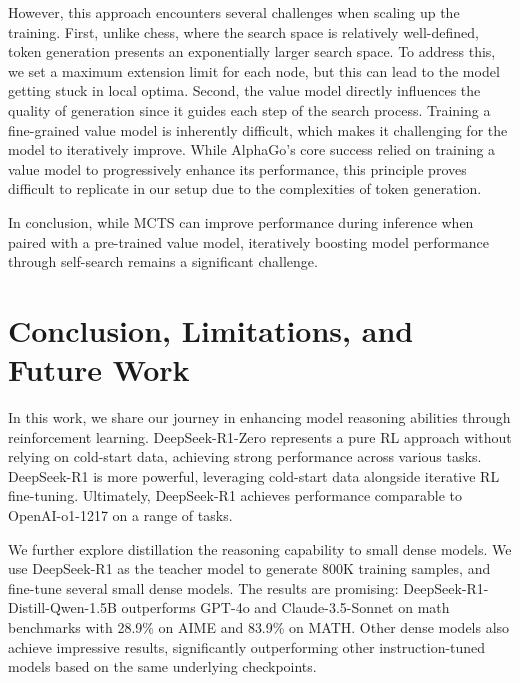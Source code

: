 \documentclass[11pt, a4paper, logo, copyright, nonumbering]{deepseek}
\newcommand{\dsri}{DeepSeek-R1}
\newcommand{\dsro}{DeepSeek-R1-Zero}
\begin{document}
{However, this approach encounters several challenges when scaling up the training. First, unlike chess, where the search space is relatively well-defined, token generation presents an exponentially larger search space. To address this, we set a maximum extension limit for each node, but this can lead to the model getting stuck in local optima. Second, the value model directly influences the quality of generation since it guides each step of the search process. Training a fine-grained value model is inherently difficult, which makes it challenging for the model to iteratively improve. While AlphaGo's core success relied on training a value model to progressively enhance its performance, this principle proves difficult to replicate in our setup due to the complexities of token generation.

In conclusion, while MCTS can improve performance during inference when paired with a pre-trained value model, iteratively boosting model performance through self-search remains a significant challenge.




\section{Conclusion, Limitations, and Future Work}

In this work, we share our journey in enhancing model reasoning abilities through reinforcement learning. \dsro{} represents a pure RL approach without relying on cold-start data, achieving strong performance across various tasks. \dsri{} is more powerful, leveraging cold-start data alongside iterative RL fine-tuning. Ultimately, \dsri{} achieves performance comparable to OpenAI-o1-1217 on a range of tasks.

We further explore distillation the reasoning capability to small dense models. We use \dsri{} as the teacher model to generate 800K training samples, and fine-tune several small dense models. The results are promising: DeepSeek-R1-Distill-Qwen-1.5B outperforms GPT-4o and Claude-3.5-Sonnet on math benchmarks with 28.9\% on AIME and 83.9\% on MATH. Other dense models also achieve impressive results, significantly outperforming other instruction-tuned models based on the same underlying checkpoints.

}
\end{document}
